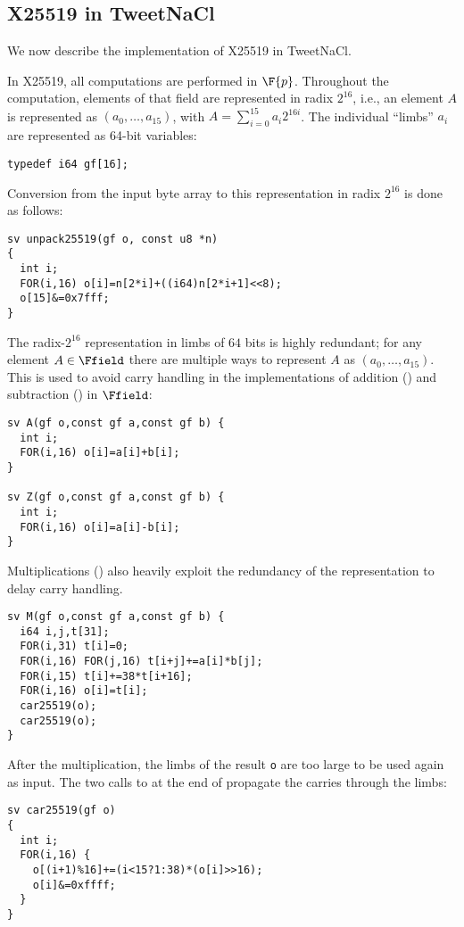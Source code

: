 \subsection{X25519 in TweetNaCl}
\label{subsec:X25519-TweetNaCl}

We now describe the implementation of X25519 in TweetNaCl.

In X25519, all computations are performed in $\F{p}$.
Throughout the computation, elements of that field
are represented in radix $2^{16}$,
i.e., an element $A$ is represented as $(a_0,\dots,a_{15})$,
with $A = \sum_{i=0}^{15}a_i2^{16i}$.
The individual ``limbs'' $a_i$ are represented as
64-bit  variables:
\begin{lstlisting}[language=Ctweetnacl]
typedef i64 gf[16];
\end{lstlisting}

Conversion from the input byte array to this representation in radix $2^{16}$ is
done as follows:
\begin{lstlisting}[language=Ctweetnacl]
sv unpack25519(gf o, const u8 *n)
{
  int i;
  FOR(i,16) o[i]=n[2*i]+((i64)n[2*i+1]<<8);
  o[15]&=0x7fff;
}
\end{lstlisting}

The radix-$2^{16}$ representation in limbs of $64$ bits is
highly redundant; for any element $A \in \Ffield$ there are
multiple ways to represent $A$ as $(a_0,\dots,a_{15})$.
This is used to avoid carry handling in the implementations of addition
() and subtraction () in $\Ffield$:
\begin{lstlisting}[language=Ctweetnacl]
sv A(gf o,const gf a,const gf b) {
  int i;
  FOR(i,16) o[i]=a[i]+b[i];
}

sv Z(gf o,const gf a,const gf b) {
  int i;
  FOR(i,16) o[i]=a[i]-b[i];
}
\end{lstlisting}

Multiplications () also heavily exploit the redundancy
of the representation to delay carry handling.
\begin{lstlisting}[language=Ctweetnacl]
sv M(gf o,const gf a,const gf b) {
  i64 i,j,t[31];
  FOR(i,31) t[i]=0;
  FOR(i,16) FOR(j,16) t[i+j]+=a[i]*b[j];
  FOR(i,15) t[i]+=38*t[i+16];
  FOR(i,16) o[i]=t[i];
  car25519(o);
  car25519(o);
}
\end{lstlisting}

After the multiplication, the limbs of the result \texttt{o} are
too large to be used again as input.
The two calls to
 at the end of  propagate the carries through the limbs:
\begin{lstlisting}[language=Ctweetnacl]
sv car25519(gf o)
{
  int i;
  FOR(i,16) {
    o[(i+1)%16]+=(i<15?1:38)*(o[i]>>16);
    o[i]&=0xffff;
  }
}
\end{lstlisting}

